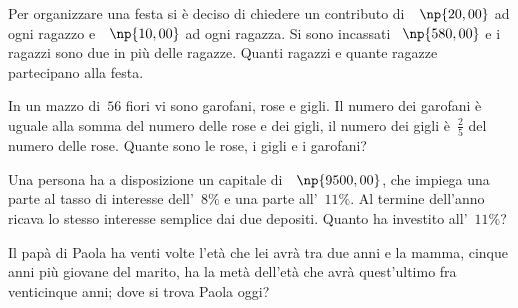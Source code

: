 \begin{multicols}{2}
\begin{esercizio}[\Ast]
\label{ese:16.98}
Per organizzare una festa si è deciso di chiedere un contributo di~\officialeuro~$\np{20,00}$ ad ogni ragazzo e~\officialeuro~$\np{10,00}$ ad ogni ragazza. Si sono incassati \officialeuro~$\np{580,00}$ e i ragazzi sono due in più delle ragazze. Quanti ragazzi e quante ragazze partecipano alla festa.
\end{esercizio}

\begin{esercizio}[\Ast]
\label{ese:16.99}
In un mazzo di~$56$ fiori vi sono garofani, rose e gigli. Il numero dei garofani è uguale alla somma del numero delle rose e dei gigli, il numero dei gigli è~$\frac{2}{5}$ del numero delle rose. Quante sono le rose, i gigli e i garofani?
\end{esercizio}

\begin{esercizio}[\Ast]
\label{ese:16.100}
Una persona ha a disposizione un capitale di~\officialeuro~$\np{9500,00}$, che impiega una parte al tasso di interesse dell'~$8\%$ e una parte all'~$11\%$. Al termine dell'anno ricava lo stesso interesse semplice dai due depositi. Quanto ha investito all'~$11\%$?
\end{esercizio}

\begin{esercizio}[\croce]
\label{ese:16.101}
Il papà di Paola ha venti volte l'età che lei avrà tra due anni e la mamma, cinque anni più giovane del marito, ha la metà dell'età che avrà quest'ultimo fra venticinque anni; dove si trova Paola oggi?
\end{esercizio}
\end{multicols}
